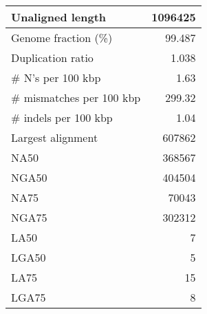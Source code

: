 \documentclass[12pt,a4paper]{article}
\begin{document}
\begin{table}[ht]
\begin{center}
\begin{tabular}{|l*{1}{|r}|}
Unaligned length & 1096425 \\ \hline
Genome fraction (\%) & 99.487 \\ \hline
Duplication ratio & 1.038 \\ \hline
\# N's per 100 kbp & 1.63 \\ \hline
\# mismatches per 100 kbp & 299.32 \\ \hline
\# indels per 100 kbp & 1.04 \\ \hline
Largest alignment & 607862 \\ \hline
NA50 & 368567 \\ \hline
NGA50 & 404504 \\ \hline
NA75 & 70043 \\ \hline
NGA75 & 302312 \\ \hline
LA50 & 7 \\ \hline
LGA50 & 5 \\ \hline
LA75 & 15 \\ \hline
LGA75 & 8 \\ \hline
\end{tabular}
\end{center}
\end{table}
\end{document}
